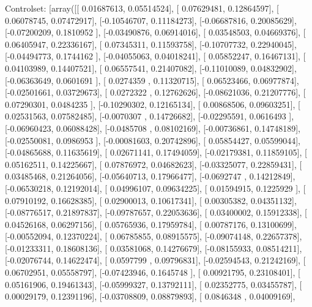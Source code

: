 \documentclass{article}
\begin{document}
Controlset: [array([[ 0.01687613,  0.05514524],
       [ 0.07629481,  0.12864597],
       [ 0.06078745,  0.07472917],
       [-0.10546707,  0.11184273],
       [-0.06687816,  0.20085629],
       [-0.07200209,  0.1810952 ],
       [-0.03490876,  0.06914016],
       [ 0.03548503,  0.04669376],
       [ 0.06405947,  0.22336167],
       [ 0.07345311,  0.11593758],
       [-0.10707732,  0.22940045],
       [-0.04494773,  0.1744162 ],
       [-0.04055063,  0.04018241],
       [ 0.05852247,  0.16467131],
       [ 0.04103989,  0.14407521],
       [ 0.06557541,  0.21407082],
       [-0.11010089,  0.04832902],
       [-0.06363649,  0.0601691 ],
       [ 0.0274359 ,  0.11320715],
       [ 0.06523466,  0.06977874],
       [-0.02501661,  0.03729673],
       [ 0.0272322 ,  0.12762626],
       [-0.08621036,  0.21207776],
       [ 0.07290301,  0.0484235 ],
       [-0.10290302,  0.12165134],
       [ 0.00868506,  0.09603251],
       [ 0.02531563,  0.07582485],
       [-0.0070307 ,  0.14726682],
       [-0.02295591,  0.0616493 ],
       [-0.06960423,  0.06088428],
       [-0.0485708 ,  0.08102169],
       [-0.00736861,  0.14748189],
       [-0.02550081,  0.0986953 ],
       [-0.00081603,  0.20742896],
       [ 0.05854427,  0.05599044],
       [-0.04865688,  0.11635619],
       [ 0.02671141,  0.17494059],
       [-0.02179381,  0.11859105],
       [ 0.05162511,  0.14225667],
       [ 0.07876972,  0.04682623],
       [-0.03325077,  0.22859431],
       [ 0.03485468,  0.21264056],
       [-0.05640713,  0.17966477],
       [-0.0692747 ,  0.14212849],
       [-0.06530218,  0.12192014],
       [ 0.04996107,  0.09634225],
       [ 0.01594915,  0.1225929 ],
       [ 0.07910192,  0.16628385],
       [ 0.02900013,  0.10617341],
       [ 0.00305382,  0.04351132],
       [-0.08776517,  0.21897837],
       [-0.09787657,  0.22053636],
       [ 0.03400002,  0.15912338],
       [ 0.04526168,  0.06297156],
       [ 0.05765936,  0.17959784],
       [ 0.00787176,  0.13100699],
       [-0.00552094,  0.12370224],
       [ 0.06785855,  0.08915575],
       [-0.09074148,  0.22657378],
       [-0.01233311,  0.18608136],
       [ 0.03581068,  0.14276679],
       [-0.08155933,  0.08514211],
       [-0.02076744,  0.14622474],
       [ 0.0597799 ,  0.09796831],
       [-0.02594543,  0.21242169],
       [ 0.06702951,  0.05558797],
       [-0.07423946,  0.1645748 ],
       [ 0.00921795,  0.23108401],
       [ 0.05161906,  0.19461343],
       [-0.05999327,  0.13792111],
       [ 0.02352775,  0.03455787],
       [ 0.00029179,  0.12391196],
       [-0.03708809,  0.08879893],
       [ 0.0846348 ,  0.04009169],
\end{document}
